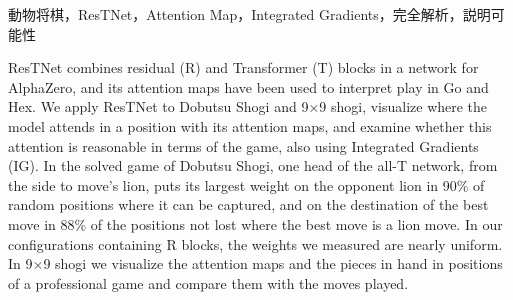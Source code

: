\documentclass[submit]{ipsj}
\begin{document}
\begin{jkeyword}
動物将棋，ResTNet，Attention Map，Integrated Gradients，完全解析，説明可能性
\end{jkeyword}

\begin{eabstract}
ResTNet combines residual (R) and Transformer (T) blocks in a network for AlphaZero, and its attention maps have been used to interpret play in Go and Hex.
We apply ResTNet to Dobutsu Shogi and 9×9 shogi, visualize where the model attends in a position with its attention maps, and examine whether this attention is reasonable in terms of the game, also using Integrated Gradients (IG).
In the solved game of Dobutsu Shogi, one head of the all-T network, from the side to move's lion, puts its largest weight on the opponent lion in 90\% of random positions where it can be captured,
and on the destination of the best move in 88\% of the positions not lost where the best move is a lion move.
In our configurations containing R blocks, the weights we measured are nearly uniform.
In 9×9 shogi we visualize the attention maps and the pieces in hand in positions of a professional game and compare them with the moves played.

\end{eabstract}
\end{document}
